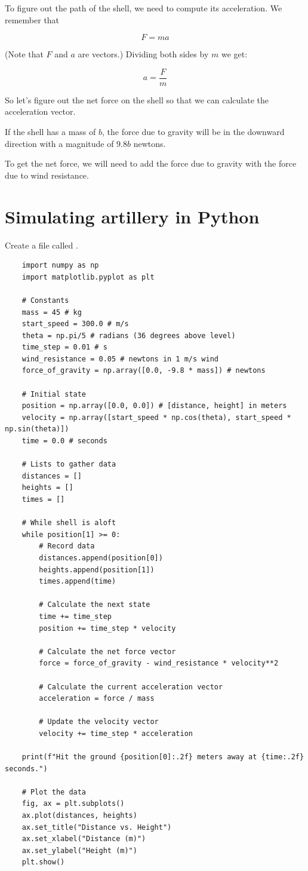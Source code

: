 To figure out the path of the shell, we need to compute its acceleration. We remember that

$$F = m a$$

(Note that $F$ and $a$ are vectors.)  Dividing both sides by $m$ we get:

$$a = \frac{F}{m}$$

So let's figure out the net force on the shell so that we can calculate the acceleration vector.

If the shell has a mass of $b$, the force due to gravity will be in the
downward direction with a magnitude of $9.8 b$ newtons.

To get the net force, we will need to add the force due to gravity
with the force due to wind resistance.

\section{Simulating artillery in Python}

Create a file called .

\begin{Verbatim}
    import numpy as np
    import matplotlib.pyplot as plt
    
    # Constants
    mass = 45 # kg
    start_speed = 300.0 # m/s
    theta = np.pi/5 # radians (36 degrees above level)
    time_step = 0.01 # s
    wind_resistance = 0.05 # newtons in 1 m/s wind
    force_of_gravity = np.array([0.0, -9.8 * mass]) # newtons
    
    # Initial state
    position = np.array([0.0, 0.0]) # [distance, height] in meters
    velocity = np.array([start_speed * np.cos(theta), start_speed * np.sin(theta)])
    time = 0.0 # seconds
    
    # Lists to gather data
    distances = []
    heights = []
    times = []
    
    # While shell is aloft
    while position[1] >= 0:
        # Record data
        distances.append(position[0])
        heights.append(position[1])
        times.append(time)
    
        # Calculate the next state
        time += time_step
        position += time_step * velocity
    
        # Calculate the net force vector
        force = force_of_gravity - wind_resistance * velocity**2
    
        # Calculate the current acceleration vector
        acceleration = force / mass
    
        # Update the velocity vector   
        velocity += time_step * acceleration
    
    print(f"Hit the ground {position[0]:.2f} meters away at {time:.2f} seconds.")
    
    # Plot the data
    fig, ax = plt.subplots()
    ax.plot(distances, heights)
    ax.set_title("Distance vs. Height")
    ax.set_xlabel("Distance (m)")
    ax.set_ylabel("Height (m)")
    plt.show()        
\end{Verbatim}

